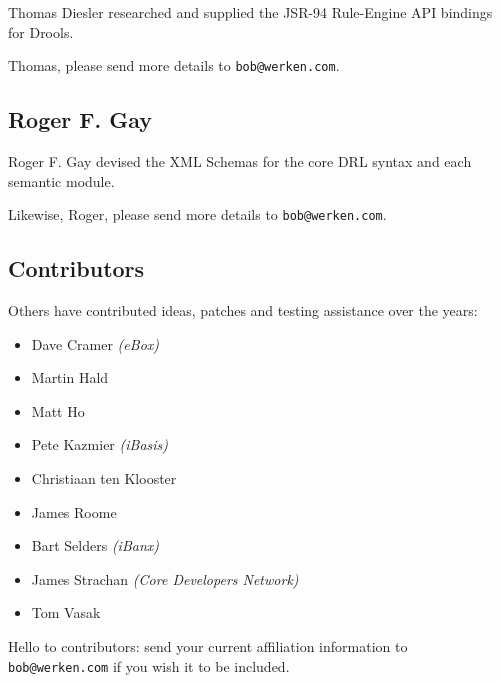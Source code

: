 Thomas Diesler researched and supplied the JSR-94 Rule-Engine API
bindings for Drools.

\begin{ednote}
Thomas, please send more details to \texttt{bob@werken.com}.
\end{ednote}

\subsection{Roger F. Gay}

Roger F. Gay devised the XML Schemas for the core DRL syntax and
each semantic module.

\begin{ednote}
Likewise, Roger, please send more details to \texttt{bob@werken.com}.
\end{ednote}

\subsection{Contributors}

Others have contributed ideas, patches and testing assistance
over the years:

\begin{itemize}
  \item Dave Cramer \emph{(eBox)}
  \item Martin Hald
  \item Matt Ho
  \item Pete Kazmier \emph{(iBasis)}
  \item Christiaan ten Klooster
  \item James Roome
  \item Bart Selders \emph{(iBanx)}
  \item James Strachan \emph{(Core Developers Network)}
  \item Tom Vasak
\end{itemize}


\begin{ednote}
Hello to contributors: send your current affiliation information
to \texttt{bob@werken.com} if you wish it to be included.
\end{ednote}

